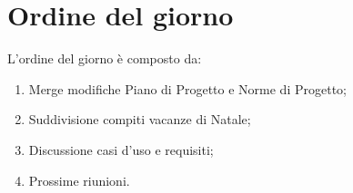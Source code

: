 \section{Ordine del giorno}
L'ordine del giorno è composto da: 
\begin{enumerate}
	\item Merge modifiche Piano di Progetto e Norme di Progetto;
	\item Suddivisione compiti vacanze di Natale;
	\item Discussione casi d'uso e requisiti;
	\item Prossime riunioni.
\end{enumerate}
